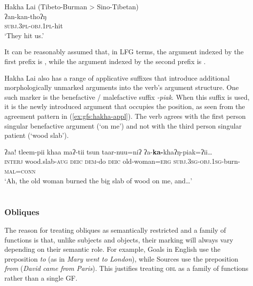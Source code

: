 \documentclass[output=paper]{../langscibook}
\begin{document}
 \ea\label{ex:gfs:hakha-agr}
 Hakha Lai (Tibeto-Burman > Sino-Tibetan)\\
 \gll ʔan-kan-thoʔŋ\\
 \textsc{subj.3pl-obj.1pl}-hit\\
 \trans `They hit us.' \citep[16]{peterson2007}
 \z
 
 \noindent It can be reasonably assumed that, in LFG terms, the argument indexed by the first prefix is \SUBJ, while the argument indexed by the second prefix is \OBJ.
 
 Hakha Lai also has a range of applicative suffixes that introduce additional morphologically unmarked arguments into the verb's argument structure. One such marker is the benefactive / malefactive suffix \textit{-piak}. When this suffix is used, it is the newly introduced argument that occupies the \OBJ position, as seen from the agreement pattern in (\ref{ex:gfs:hakha-appl}). The verb agrees with the first person singular benefactive argument (`on me') and not with the third person singular patient (`wood slab').
 
 \ea\label{ex:gfs:hakha-appl}
 \gll ʔaa! tleem-pii khaa maʔ-tii tsun taar-nuu=niʔ ʔa-\textbf{ka-}khaʔŋ-piak=ʔii…\\
 \textsc{interj} wood.slab\textsc{-aug} \textsc{deic} \textsc{dem}-do \textsc{deic} old-woman=\textsc{erg} \textsc{subj.3sg}-\textsc{obj.1sg}-burn-\textsc{mal=conn}\\
 \trans `Ah, the old woman burned the big slab of wood on me, and…'\\\hspace*{\fill} \citep[17]{peterson2007}\\
 \z
 
 \subsubsection{Obliques\label{sect:gfs:obl}}
 
 The reason for treating obliques as semantically restricted and a family of functions is that, unlike subjects and objects, their marking will always vary depending on their semantic role. For example, Goals in English use the preposition \textit{to} (as in \textit{Mary went to London}), while Sources use the preposition \textit{from} (\textit{David came from Paris}). This justifies treating \textsc{obl} as a family of functions rather than a single GF.
 
\end{document}
